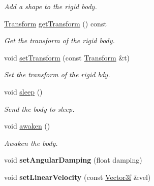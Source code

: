 \begin{Indent}
\begin{DoxyCompactItemize}
\begin{DoxyCompactList}\small\item\em Add a shape to the rigid body. \end{DoxyCompactList}\item 
\mbox{\label{classrev_1_1_rigid_body_a856285d39d3a1105fabd9f6bd8b1ec45}} 
\mbox{\hyperlink{classrev_1_1_transform}{Transform}} \mbox{\hyperlink{classrev_1_1_rigid_body_a856285d39d3a1105fabd9f6bd8b1ec45}{get\+Transform}} () const
\begin{DoxyCompactList}\small\item\em Get the transform of the rigid body. \end{DoxyCompactList}\item 
\mbox{\label{classrev_1_1_rigid_body_a2340d1c28a9e81edd2511c7edcf10e23}} 
void \mbox{\hyperlink{classrev_1_1_rigid_body_a2340d1c28a9e81edd2511c7edcf10e23}{set\+Transform}} (const \mbox{\hyperlink{classrev_1_1_transform}{Transform}} \&t)
\begin{DoxyCompactList}\small\item\em Set the transform of the rigid bdy. \end{DoxyCompactList}\item 
\mbox{\label{classrev_1_1_rigid_body_a48eb02650ef0f72fb958ec31023cd81c}} 
void \mbox{\hyperlink{classrev_1_1_rigid_body_a48eb02650ef0f72fb958ec31023cd81c}{sleep}} ()
\begin{DoxyCompactList}\small\item\em Send the body to sleep. \end{DoxyCompactList}\item 
\mbox{\label{classrev_1_1_rigid_body_adb15fd368d12329db16cd78282bb8020}} 
void \mbox{\hyperlink{classrev_1_1_rigid_body_adb15fd368d12329db16cd78282bb8020}{awaken}} ()
\begin{DoxyCompactList}\small\item\em Awaken the body. \end{DoxyCompactList}\item 
\mbox{\label{classrev_1_1_rigid_body_a879c1154ad9d6a95f473d41e9d2f140b}} 
void {\bfseries set\+Angular\+Damping} (float damping)
\item 
\mbox{\label{classrev_1_1_rigid_body_a298d7d759e3bef9a43974db529466775}} 
void {\bfseries set\+Linear\+Velocity} (const \mbox{\hyperlink{classrev_1_1_vector}{Vector3f}} \&vel)
\end{DoxyCompactItemize}
\end{Indent}
